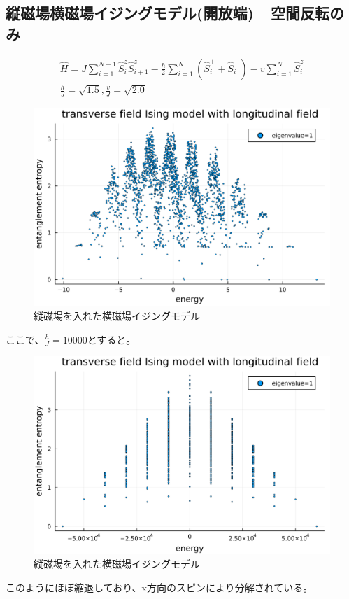 \documentclass{ltjsarticle}
\begin{document}
\subsection*{縦磁場横磁場イジングモデル(開放端)—空間反転のみ}
\begin{gather}
  \hat{H}=J\sum_{i=1}^{N-1} \hat{S}_i^z\hat{S}_{i+1}^z - \frac{h}{2}\sum_{i=1}^{N} \left( \hat{S}_i^+ + \hat{S}_i^- \right) - v\sum_{i=1}^{N} \hat{S}_i^z\\
  \frac{h}{J}=\sqrt{1.5},\frac{v}{J}=\sqrt{2.0}
\end{gather}
\begin{figure}[H]
  \centering
  \includegraphics[width=150mm]{entropy_siteflip.png}
  \caption{縦磁場を入れた横磁場イジングモデル}
  \label{fig:entropy_siteflip}
\end{figure}
ここで、$\frac{h}{J}=10000$とすると。
\begin{figure}[H]
  \centering
  \includegraphics[width=150mm]{entropy_hjmax.png}
  \caption{縦磁場を入れた横磁場イジングモデル}
  \label{fig:entropy_hjmax}
\end{figure}
このようにほぼ縮退しており、x方向のスピンにより分解されている。\\
\end{document}
